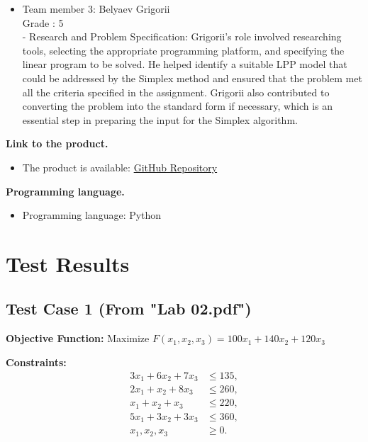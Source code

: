 \documentclass[12pt, legalpaper]{exam}
\begin{document}
\begin{itemize}
    \item Team member 3: Belyaev Grigorii
    \\ Grade : 5
    \\- Research and Problem Specification: Grigorii's role involved researching tools, selecting the appropriate programming platform, and specifying the linear program to be solved. He helped identify a suitable LPP model that could be addressed by the Simplex method and ensured that the problem met all the criteria specified in the assignment. Grigorii also contributed to converting the problem into the standard form if necessary, which is an essential step in preparing the input for the Simplex algorithm.
\end{itemize}
\vspace{12pt}
\noindent     
\textbf{Link to the product.}
\begin{itemize}
    \item The product is available: \href{https://github.com/GodDamnMan/Optimization_prog_1}{GitHub Repository}
\end{itemize}

\vspace{12pt}

\noindent  \textbf{Programming language.}
\begin{itemize}
    \item Programming language:  Python
\end{itemize}

\vspace{12pt}
\newpage

\section*{Test Results}

\subsection*{Test Case 1 (From "Lab 02.pdf")}

\textbf{Objective Function:} Maximize \( F(x_1, x_2, x_3) = 100x_1 + 140x_2 + 120x_3 \)

\textbf{Constraints:}
\[
\begin{aligned}
3x_1 + 6x_2 + 7x_3 &\leq 135, \\
2x_1 + x_2 + 8x_3 &\leq 260, \\
x_1 + x_2 + x_3 &\leq 220, \\
5x_1 + 3x_2 + 3x_3 &\leq 360, \\
x_1, x_2, x_3 &\geq 0.
\end{aligned}
\]
\end{document}
